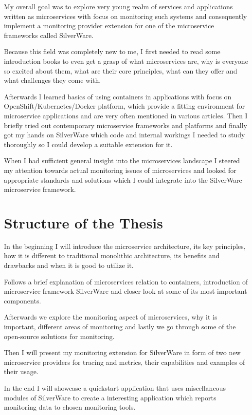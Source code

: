 \documentclass[12pt,oneside]{fithesis2}
\begin{document}
My overall goal was to explore very young realm of services and applications written as microservices with focus on monitoring such systems and consequently implement a monitoring provider extension for one of the microservice frameworks called SilverWare.

Because this field was completely new to me, I first needed to read some introduction books to even get a grasp of what microservices are, why is everyone so excited about them, what are their core principles, what can they offer and what challenges they come with.

Afterwards I learned basics of using containers in applications with focus on OpenShift/Kubernetes/Docker platform, which provide a fitting environment for microservice applications and are very often mentioned in various articles. Then I briefly tried out contemporary microservice frameworks and platforms and finally got my hands on SilverWare which code and internal workings I needed to study thoroughly so I could develop a suitable extension for it.

When I had sufficient general insight into the microservices landscape I steered my attention towards actual monitoring issues of microservices and looked for appropriate standards and solutions which I could integrate into the SilverWare microservice framework.

\section{Structure of the Thesis}

In the beginning I will introduce the microservice architecture, its key principles, how it is different to traditional monolithic architecture, its benefits and drawbacks and when it is good to utilize it.

Follows a brief explanation of microservices relation to containers, introduction of microservice framework SilverWare and closer look at some of its most important components.

Afterwards we explore the monitoring aspect of microservices, why it is important, different areas of monitoring and lastly we go through some of the open-source solutions for monitoring.

Then I will present my monitoring extension for SilverWare in form of two new microservice providers for tracing and metrics, their capabilities and examples of their usage.

In the end I will showcase a quickstart application that uses miscellaneous modules of SilverWare to create a interesting application which reports monitoring data to chosen monitoring tools.
\end{document}
